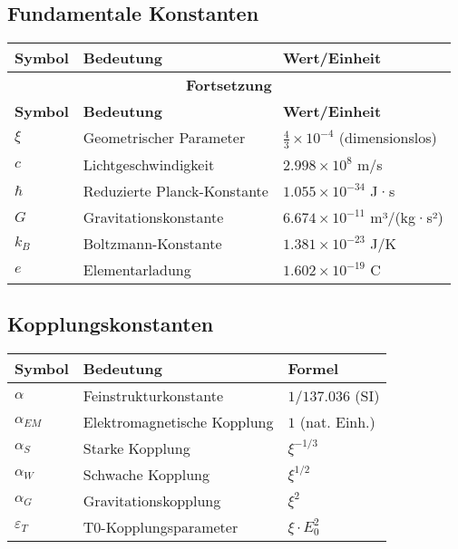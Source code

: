 \documentclass[12pt,a4paper]{article}
\theoremstyle{definition}
\begin{document}
\subsection{Fundamentale Konstanten}
\begin{longtable}{lll}
	\toprule
	\textbf{Symbol} & \textbf{Bedeutung} & \textbf{Wert/Einheit} \\
	\midrule
	\endfirsthead
	\multicolumn{3}{c}{{\bfseries Fortsetzung}} \\
	\toprule
	\textbf{Symbol} & \textbf{Bedeutung} & \textbf{Wert/Einheit} \\
	\midrule
	\endhead
	\bottomrule
	\endfoot
	\bottomrule
	\endlastfoot
	
	$\xi$ & Geometrischer Parameter & $\frac{4}{3} \times 10^{-4}$ (dimensionslos) \\
	$c$ & Lichtgeschwindigkeit & $2.998 \times 10^8$ m/s \\
	$\hbar$ & Reduzierte Planck-Konstante & $1.055 \times 10^{-34}$ J·s \\
	$G$ & Gravitationskonstante & $6.674 \times 10^{-11}$ m³/(kg·s²) \\
	$k_B$ & Boltzmann-Konstante & $1.381 \times 10^{-23}$ J/K \\
	$e$ & Elementarladung & $1.602 \times 10^{-19}$ C \\
\end{longtable}

\subsection{Kopplungskonstanten}
\begin{longtable}{lll}
	\toprule
	\textbf{Symbol} & \textbf{Bedeutung} & \textbf{Formel} \\
	\midrule
	$\alpha$ & Feinstrukturkonstante & $1/137.036$ (SI) \\
	$\alpha_{EM}$ & Elektromagnetische Kopplung & $1$ (nat. Einh.) \\
	$\alpha_S$ & Starke Kopplung & $\xi^{-1/3}$ \\
	$\alpha_W$ & Schwache Kopplung & $\xi^{1/2}$ \\
	$\alpha_G$ & Gravitationskopplung & $\xi^{2}$ \\
	$\varepsilon_T$ & T0-Kopplungsparameter & $\xi \cdot E_0^2$ \\
	\bottomrule
\end{longtable}
\end{document}
